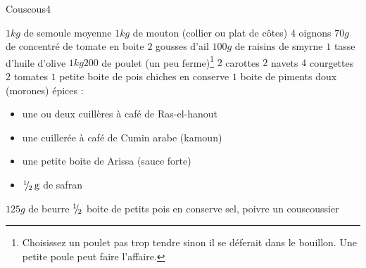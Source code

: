 \begin{recette}{Couscous}{4}{}{}
\begin{ingredients}[8 pers.]
\ingredient $1\unit{kg}$ de semoule moyenne
\ingredient $1\unit{kg}$ de mouton (collier ou plat de côtes)
\ingredient $4$ oignons
\ingredient $70\unit{g}$ de concentré de tomate en boite
\ingredient $2$ gousses d'ail
\ingredient $100\unit{g}$ de raisins de smyrne
\ingredient $1$ tasse d'huile d'olive
\ingredient $1\unit{kg} 200$ de poulet (un peu ferme)\footnote{Choisissez un poulet pas trop tendre sinon il se déferait dans le bouillon. Une petite poule peut faire l'affaire.}
\ingredient $2$ carottes
\ingredient $2$ navets
\ingredient $4$ courgettes
\ingredient $2$ tomates
\ingredient $1$ petite boite de pois chiches en conserve
\ingredient $1$ boite de piments doux (morones)
\ingredient épices : \begin{itemize}
		\item une ou deux cuillères à café de Ras-el-hanout
		\item une cuillerée à café de Cumin arabe (kamoun)
		\item une petite boite de Arissa (sauce forte)
		\item ${{}^{1\!\!}/ _{\!2}}\mathrm{\thinspace g}$ de safran
		\end{itemize}
\ingredient $125\unit{g}$ de beurre
\ingredient ${{}^{1\!\!}/ _{\!2}}$ boite de petits pois en conserve
\ingredient sel, poivre
\ingredient un couscoussier
\end{ingredients}


\end{recette}
